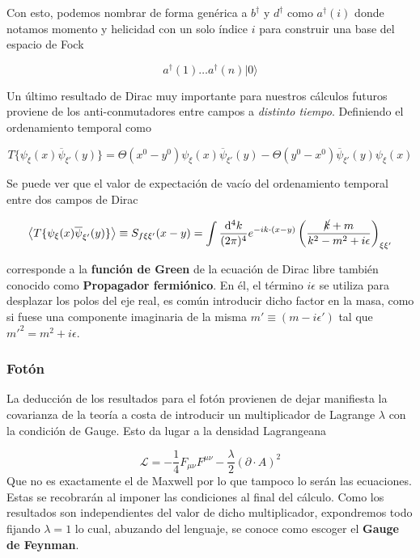 \documentclass{article}
\numberwithin{equation}{section}
\begin{document}
Con esto, podemos nombrar de forma genérica a $ b^{\dagger} $ y $ d^{\dagger} $ como $ a^{\dagger}(i) $ donde notamos momento y helicidad con un solo índice $ i $ para construir una base del espacio de Fock

\begin{equation}\label{key}
a^{\dagger}(1)\dots a^{\dagger}(n)|0\rangle
\end{equation}  

Un último resultado de Dirac muy importante para nuestros cálculos futuros proviene de los anti-conmutadores entre campos a \textit{distinto tiempo}. Definiendo el ordenamiento temporal como

\begin{equation}\label{key}
T\{\psi_{\xi}(x)\overline{\psi}_{\xi'}(y)\}=\Theta(x^0 - y^0)\psi_{\xi}(x)\overline{\psi}_{\xi'}(y) - \Theta(y^0 - x^0)\overline{\psi}_{\xi'}(y)\psi_{\xi}(x)
\end{equation}

Se puede ver que el valor de expectación de vacío del ordenamiento temporal entre dos campos de Dirac  

\begin{equation}\label{prop_dirac}
\left\langle T\{\psi_{\xi}(x)\overline{\psi}_{\xi'}(y)\} \right\rangle \equiv S_{f \xi \xi'}(x-y)=\int\frac{\mathrm{d^4}k}{(2\pi)^{4}}e^{-ik\cdot(x-y)}\left(\frac{\cancel{k}+m}{k^2-m^2+i\epsilon}\right)_{\xi\xi'}
\end{equation}

corresponde a la \textbf{función de Green} de la ecuación de Dirac libre también conocido como \textbf{Propagador fermiónico}. En él, el término $ i\epsilon $ se utiliza para desplazar los polos del eje real, es común introducir dicho factor en la masa, como si fuese una componente imaginaria de la misma $ m'\equiv(m-i\epsilon')$ tal que $ m'^2=m^2 + i\epsilon $.

\subsubsection{Fotón}\label{sec_foton}

La deducción de los resultados para el fotón provienen de dejar manifiesta la covarianza de la teoría a costa de introducir un multiplicador de Lagrange $ \lambda $ con la condición de Gauge. Esto da lugar a la densidad Lagrangeana

\begin{equation}\label{key}
\mathscr{L}=-\frac{1}{4}F_{\mu\nu}F^{\mu\nu}-\frac{\lambda}{2}\left(\partial \cdot A\right)^2
\end{equation}
Que no es exactamente el de Maxwell por lo que tampoco lo serán las ecuaciones. Estas se recobrarán al imponer las condiciones al final del cálculo. Como los resultados son independientes del valor de dicho multiplicador, expondremos todo fijando $ \lambda=1 $ lo cual, abuzando del lenguaje, se conoce como escoger el \textbf{Gauge de Feynman}.
\end{document}
